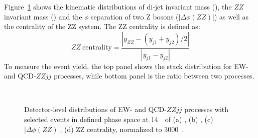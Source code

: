 Figure~\ref{fig:kine} shows the kinematic distributions of di-jet invariant mass (\mjj), the $ZZ$ invariant mass (\mzz) and 
the $\phi$ separation of two Z bosons ($|\Delta\phi(ZZ)|$) as well as the centrality of the ZZ system.
The ZZ centrality is defined as:
\begin{equation}
  ZZ~\text{centrality} = \frac{|y_{ZZ} - (y_{j1} + y_{j2})/2|}{|y_{j1} - y_{j2}|}
\end{equation}
To measure the event yield, the top panel shows the stack distribution for EW- and QCD-$ZZjj$ processes,
while bottom panel is the ratio between two processes.
\begin{figure}[!htbp]
\centering
{}
\\
\caption{
Detector-level distributions of EW- and QCD-$ZZjj$ processes with selected events in defined phase space at 14~\tev~of 
(a) \mjj,
(b) \mzz,
(c) $|\Delta\phi(ZZ)|$,
(d) ZZ centrality,
normalized to 3000~\ifb{}.
}
\label{fig:kine}
\end{figure}


